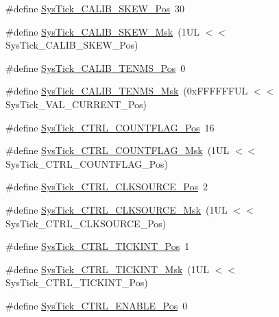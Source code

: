 \begin{DoxyCompactItemize}
\item 
\#define \hyperlink{group___c_m_s_i_s___sys_tick_gadd0c9cd6641b9f6a0c618e7982954860}{Sys\-Tick\-\_\-\-C\-A\-L\-I\-B\-\_\-\-S\-K\-E\-W\-\_\-\-Pos}~30
\item 
\#define \hyperlink{group___c_m_s_i_s___sys_tick_ga8a6a85a87334776f33d77fd147587431}{Sys\-Tick\-\_\-\-C\-A\-L\-I\-B\-\_\-\-S\-K\-E\-W\-\_\-\-Msk}~(1\-U\-L $<$$<$ Sys\-Tick\-\_\-\-C\-A\-L\-I\-B\-\_\-\-S\-K\-E\-W\-\_\-\-Pos)
\item 
\#define \hyperlink{group___c_m_s_i_s___sys_tick_gacae558f6e75a0bed5d826f606d8e695e}{Sys\-Tick\-\_\-\-C\-A\-L\-I\-B\-\_\-\-T\-E\-N\-M\-S\-\_\-\-Pos}~0
\item 
\#define \hyperlink{group___c_m_s_i_s___sys_tick_gaf1e68865c5aece2ad58971225bd3e95e}{Sys\-Tick\-\_\-\-C\-A\-L\-I\-B\-\_\-\-T\-E\-N\-M\-S\-\_\-\-Msk}~(0x\-F\-F\-F\-F\-F\-F\-U\-L $<$$<$ Sys\-Tick\-\_\-\-V\-A\-L\-\_\-\-C\-U\-R\-R\-E\-N\-T\-\_\-\-Pos)
\item 
\#define \hyperlink{group___c_m_s_i_s___sys_tick_gadbb65d4a815759649db41df216ed4d60}{Sys\-Tick\-\_\-\-C\-T\-R\-L\-\_\-\-C\-O\-U\-N\-T\-F\-L\-A\-G\-\_\-\-Pos}~16
\item 
\#define \hyperlink{group___c_m_s_i_s___sys_tick_ga1bf3033ecccf200f59baefe15dbb367c}{Sys\-Tick\-\_\-\-C\-T\-R\-L\-\_\-\-C\-O\-U\-N\-T\-F\-L\-A\-G\-\_\-\-Msk}~(1\-U\-L $<$$<$ Sys\-Tick\-\_\-\-C\-T\-R\-L\-\_\-\-C\-O\-U\-N\-T\-F\-L\-A\-G\-\_\-\-Pos)
\item 
\#define \hyperlink{group___c_m_s_i_s___sys_tick_ga24fbc69a5f0b78d67fda2300257baff1}{Sys\-Tick\-\_\-\-C\-T\-R\-L\-\_\-\-C\-L\-K\-S\-O\-U\-R\-C\-E\-\_\-\-Pos}~2
\item 
\#define \hyperlink{group___c_m_s_i_s___sys_tick_gaa41d06039797423a46596bd313d57373}{Sys\-Tick\-\_\-\-C\-T\-R\-L\-\_\-\-C\-L\-K\-S\-O\-U\-R\-C\-E\-\_\-\-Msk}~(1\-U\-L $<$$<$ Sys\-Tick\-\_\-\-C\-T\-R\-L\-\_\-\-C\-L\-K\-S\-O\-U\-R\-C\-E\-\_\-\-Pos)
\item 
\#define \hyperlink{group___c_m_s_i_s___sys_tick_ga88f45bbb89ce8df3cd2b2613c7b48214}{Sys\-Tick\-\_\-\-C\-T\-R\-L\-\_\-\-T\-I\-C\-K\-I\-N\-T\-\_\-\-Pos}~1
\item 
\#define \hyperlink{group___c_m_s_i_s___sys_tick_ga95bb984266ca764024836a870238a027}{Sys\-Tick\-\_\-\-C\-T\-R\-L\-\_\-\-T\-I\-C\-K\-I\-N\-T\-\_\-\-Msk}~(1\-U\-L $<$$<$ Sys\-Tick\-\_\-\-C\-T\-R\-L\-\_\-\-T\-I\-C\-K\-I\-N\-T\-\_\-\-Pos)
\item 
\#define \hyperlink{group___c_m_s_i_s___sys_tick_ga0b48cc1e36d92a92e4bf632890314810}{Sys\-Tick\-\_\-\-C\-T\-R\-L\-\_\-\-E\-N\-A\-B\-L\-E\-\_\-\-Pos}~0
$$
\end{DoxyCompactItemize}
